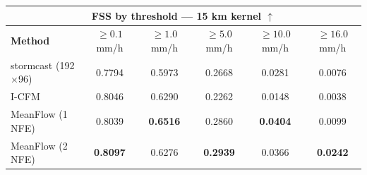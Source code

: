 \documentclass[border=10pt]{standalone}
\begin{document}
\begin{tabular}{lccccc}
\toprule
\multicolumn{6}{c}{\textbf{FSS by threshold — 15 km kernel} $\uparrow$} \\
\midrule
\textbf{Method} & $\geq 0.1$ mm/h & $\geq 1.0$ mm/h & $\geq 5.0$ mm/h & $\geq 10.0$ mm/h & $\geq 16.0$ mm/h \\
\midrule
stormcast (192$\times$96) & 0.7794 & 0.5973 & 0.2668 & 0.0281 & 0.0076 \\
I-CFM & 0.8046 & 0.6290 & 0.2262 & 0.0148 & 0.0038 \\
MeanFlow (1 NFE) & 0.8039 & \textbf{0.6516} & 0.2860 & \textbf{0.0404} & 0.0099 \\
MeanFlow (2 NFE) & \textbf{0.8097} & 0.6276 & \textbf{0.2939} & 0.0366 & \textbf{0.0242} \\
\bottomrule
\end{tabular}
\end{document}

